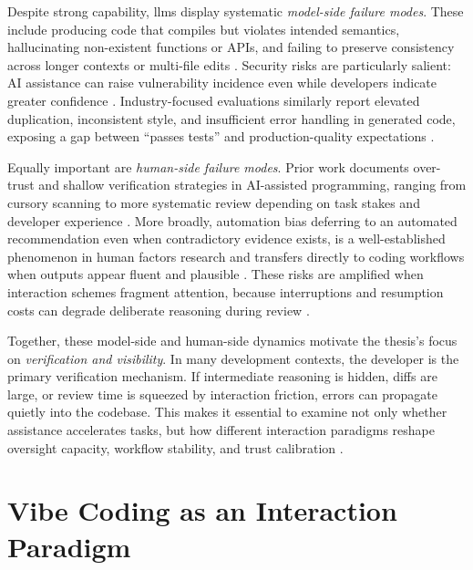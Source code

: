 Despite strong capability, \glspl{llm} display systematic \emph{model-side failure modes}. These include producing code that compiles but violates intended semantics, hallucinating non-existent functions or APIs, and failing to preserve consistency across longer contexts or multi-file edits \parencite{ji2023hallucination, zhang2023sirenssong}. Security risks are particularly salient: AI assistance can raise vulnerability incidence even while developers indicate greater confidence \parencite{perry2023insecure}. Industry-focused evaluations similarly report elevated duplication, inconsistent style, and insufficient error handling in generated code, exposing a gap between ``passes tests'' and production-quality expectations \parencite{qodo2025codequality}.

Equally important are \emph{human-side failure modes}. Prior work documents over-trust and shallow verification strategies in AI-assisted programming, ranging from cursory scanning to more systematic review depending on task stakes and developer experience \parencite{barke2023trust}. More broadly, automation bias deferring to an automated recommendation even when contradictory evidence exists, is a well-established phenomenon in human factors research and transfers directly to coding workflows when outputs appear fluent and plausible \parencite{leeSee2004trust}. These risks are amplified when interaction schemes fragment attention, because interruptions and resumption costs can degrade deliberate reasoning during review \parencite{parnin2011resumption, abad2018taskInterruption}.

Together, these model-side and human-side dynamics motivate the thesis's focus on \emph{verification and visibility}. In many development contexts, the developer is the primary verification mechanism. If intermediate reasoning is hidden, diffs are large, or review time is squeezed by interaction friction, errors can propagate quietly into the codebase. This makes it essential to examine not only whether assistance accelerates tasks, but how different interaction paradigms reshape oversight capacity, workflow stability, and trust calibration \parencite{mozannar2024reading, leeSee2004trust}.

\section{Vibe Coding as an Interaction Paradigm}
\label{sec:bg-vibe}

